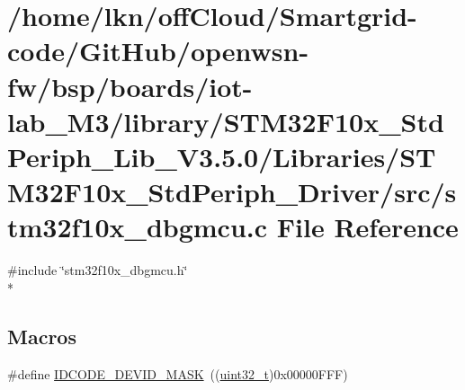 \hypertarget{iot-lab___m3_2library_2_s_t_m32_f10x___std_periph___lib___v3_85_80_2_libraries_2_s_t_m32_f10x___f8bffb4441fdd4dbabed5b2ad1a9ceca}{}\section{/home/lkn/off\+Cloud/\+Smartgrid-\/code/\+Git\+Hub/openwsn-\/fw/bsp/boards/iot-\/lab\+\_\+\+M3/library/\+S\+T\+M32\+F10x\+\_\+\+Std\+Periph\+\_\+\+Lib\+\_\+\+V3.5.0/\+Libraries/\+S\+T\+M32\+F10x\+\_\+\+Std\+Periph\+\_\+\+Driver/src/stm32f10x\+\_\+dbgmcu.c File Reference}
\label{iot-lab___m3_2library_2_s_t_m32_f10x___std_periph___lib___v3_85_80_2_libraries_2_s_t_m32_f10x___f8bffb4441fdd4dbabed5b2ad1a9ceca}
{\ttfamily \#include \char`\"{}stm32f10x\+\_\+dbgmcu.\+h\char`\"{}}\\*
\subsection*{Macros}
\begin{DoxyCompactItemize}
\item 
\#define \hyperlink{group___d_b_g_m_c_u___private___defines_gaeeece10cca80f3c632d3d77c3f2917b6}{I\+D\+C\+O\+D\+E\+\_\+\+D\+E\+V\+I\+D\+\_\+\+M\+A\+SK}~((\hyperlink{_p_e___types_8h_a33594304e786b158f3fb30289278f5af}{uint32\+\_\+t})0x00000\+F\+F\+F)
\end{DoxyCompactItemize}
